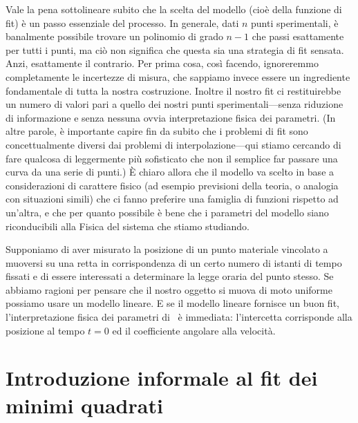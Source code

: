 Vale la pena sottolineare subito che la scelta del modello (cioè della
funzione di fit) è un passo essenziale del processo. In generale, dati $n$
punti sperimentali, è banalmente possibile trovare un polinomio di grado
$n - 1$ che passi esattamente per tutti i punti, ma ciò non significa che
questa sia una strategia di fit sensata. Anzi, esattamente il contrario. Per
prima cosa, così facendo, ignoreremmo completamente le incertezze di misura,
che sappiamo invece essere un ingrediente fondamentale di tutta la nostra
costruzione. Inoltre il nostro fit ci restituirebbe un numero di valori pari a
quello dei nostri punti sperimentali---senza riduzione di informazione e senza
nessuna ovvia interpretazione fisica dei parametri. (In altre parole, è
importante capire fin da subito che i problemi di fit sono concettualmente
diversi dai problemi di interpolazione---qui stiamo cercando di fare qualcosa
di leggermente più sofisticato che non il semplice far passare una curva da
una serie di punti.) \`E chiaro allora che il modello va scelto in base a
considerazioni di carattere fisico (ad esempio previsioni della teoria, o
analogia con situazioni simili) che ci fanno preferire una famiglia di funzioni
rispetto ad un'altra, e che per quanto possibile è bene che i parametri del
modello siano riconducibili alla Fisica del sistema che stiamo studiando.

\begin{examplebox}
  \begin{example}
    Supponiamo di aver misurato la posizione di un punto materiale vincolato a
    muoversi su una retta in corrispondenza di un certo numero di istanti di
    tempo fissati e di essere interessati a determinare la legge oraria del
    punto stesso. Se abbiamo ragioni per pensare che il nostro oggetto si muova
    di moto uniforme possiamo usare un modello lineare. E se il modello lineare
    fornisce un buon fit, l'interpretazione fisica dei parametri di
    \bestfit\ è immediata: l'intercetta corrisponde alla posizione
    al tempo $t = 0$ ed il coefficiente angolare alla velocità.
  \end{example}
\end{examplebox}


\section{Introduzione informale al fit dei minimi quadrati}
\label{sec:fit_minimi_quadrati}

